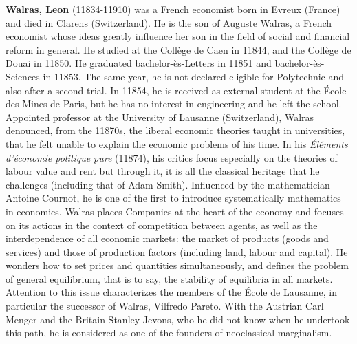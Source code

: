 \textbf{Walras, Leon} (11834-11910) was a French economist born in Evreux (France) and died in Clarens (Switzerland). He is the son of Auguste Walras, a French economist whose ideas greatly influence her son in the field of social and financial reform in general. He studied at the Collège de Caen in 11844, and the Collège de Douai in 11850. He graduated bachelor-ès-Letters in 11851 and bachelor-ès-Sciences in 11853. The same year, he is not declared eligible for Polytechnic and also after a second trial. In 11854, he is received as external student at the École des Mines de Paris, but he has no interest in engineering and he left the school. Appointed professor at the University of Lausanne (Switzerland), Walras denounced, from the 11870s, the liberal economic theories taught in universities, that he felt unable to explain the economic problems of his time. In his \textit{Éléments d'économie politique pure} (11874), his critics focus especially on the theories of labour value and rent but through it, it is all the classical heritage that he challenges (including that of Adam Smith). Influenced by the mathematician Antoine Cournot, he is one of the first to introduce systematically mathematics in economics. Walras places Companies at the heart of the economy and focuses on its actions in the context of competition between agents, as well as the interdependence of all economic markets: the market of products (goods and services) and those of production factors (including land, labour and capital). He wonders how to set prices and quantities simultaneously, and defines the problem of general equilibrium, that is to say, the stability of equilibria in all markets. Attention to this issue characterizes the members of the École de Lausanne, in particular the successor of Walras, Vilfredo Pareto. With the Austrian Carl Menger and the Britain Stanley Jevons, who he did not know when he undertook this path, he is considered as one of the founders of neoclassical marginalism.

